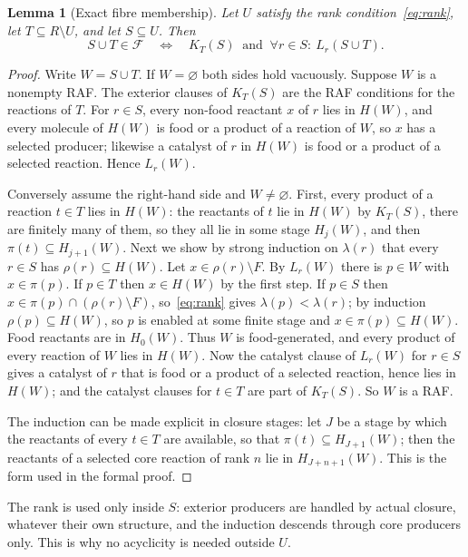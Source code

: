 \documentclass[11pt,a4paper]{article}
\theoremstyle{plain}
\newtheorem{lemma}[theorem]{Lemma}
\theoremstyle{definition}
\theoremstyle{remark}
\newcommand{\FF}{\mathcal F}
\begin{document}
\begin{lemma}[Exact fibre membership]\label{lem:adapter}
Let $U$ satisfy the rank condition~\eqref{eq:rank}, let $T\subseteq R\setminus U$, and let $S\subseteq U$. Then
\begin{equation}\label{eq:adapter}
 S\cup T\in\FF\quad\Longleftrightarrow\quad K_T(S)\ \text{ and }\ \forall r\in S:\ L_r(S\cup T).
\end{equation}
\end{lemma}
\begin{proof}
Write $W=S\cup T$. If $W=\varnothing$ both sides hold vacuously. Suppose $W$ is a nonempty RAF. The exterior clauses of $K_T(S)$ are the RAF conditions for the reactions of $T$. For $r\in S$, every non-food reactant $x$ of $r$ lies in $H(W)$, and every molecule of $H(W)$ is food or a product of a reaction of $W$, so $x$ has a selected producer; likewise a catalyst of $r$ in $H(W)$ is food or a product of a selected reaction. Hence $L_r(W)$.

Conversely assume the right-hand side and $W\ne\varnothing$. First, every product of a reaction $t\in T$ lies in $H(W)$: the reactants of $t$ lie in $H(W)$ by $K_T(S)$, there are finitely many of them, so they all lie in some stage $H_j(W)$, and then $\pi(t)\subseteq H_{j+1}(W)$. Next we show by strong induction on $\lambda(r)$ that every $r\in S$ has $\rho(r)\subseteq H(W)$. Let $x\in\rho(r)\setminus F$. By $L_r(W)$ there is $p\in W$ with $x\in\pi(p)$. If $p\in T$ then $x\in H(W)$ by the first step. If $p\in S$ then $x\in\pi(p)\cap(\rho(r)\setminus F)$, so~\eqref{eq:rank} gives $\lambda(p)<\lambda(r)$; by induction $\rho(p)\subseteq H(W)$, so $p$ is enabled at some finite stage and $x\in\pi(p)\subseteq H(W)$. Food reactants are in $H_0(W)$. Thus $W$ is food-generated, and every product of every reaction of $W$ lies in $H(W)$. Now the catalyst clause of $L_r(W)$ for $r\in S$ gives a catalyst of $r$ that is food or a product of a selected reaction, hence lies in $H(W)$; and the catalyst clauses for $t\in T$ are part of $K_T(S)$. So $W$ is a RAF.

The induction can be made explicit in closure stages: let $J$ be a stage by which the reactants of every $t\in T$ are available, so that $\pi(t)\subseteq H_{J+1}(W)$; then the reactants of a selected core reaction of rank $n$ lie in $H_{J+n+1}(W)$. This is the form used in the formal proof.
\end{proof}

The rank is used only inside $S$: exterior producers are handled by actual closure, whatever their own structure, and the induction descends through core producers only. This is why no acyclicity is needed outside $U$.
\end{document}
